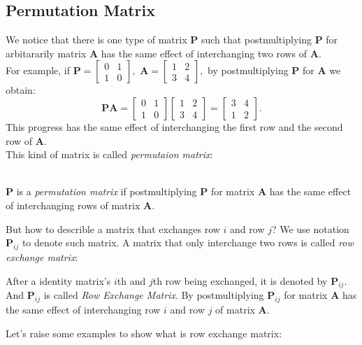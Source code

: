 \subsection{Permutation Matrix}
We notice that there is one type of matrix $\bm P$ such that postmultiplying $\bm P$ for arbitararily matrix $\bm A$ has the same effect of interchanging two rows of $\bm A$.\\
For example, if $\bm P=\begin{bmatrix}
0&1\\1&0
\end{bmatrix},$ $\bm A=\begin{bmatrix}
1&2\\3&4
\end{bmatrix},$ by postmultiplying $\bm P$ for $\bm A$ we obtain:
\[
\bm{PA}=\begin{bmatrix}
0&1\\1&0
\end{bmatrix}\begin{bmatrix}
1&2\\3&4
\end{bmatrix}=\begin{bmatrix}
3&4\\1&2
\end{bmatrix}.
\]
This progress has the same effect of interchanging the first row and the second row of $\bm A$.\\
This kind of matrix is called \textit{permutaion matrix}:
\begin{definition}\qquad\\
$\bm P$ is a \emph{permutation matrix} if postmultiplying $\bm P$ for matrix $\bm A$ has the same effect of interchanging rows of matrix $\bm A$.
\end{definition}
But how to describle a matrix that exchanges row $i$ and row $j$? We use notation $\bm P_{ij}$ to denote such
matrix. A matrix that only interchange two rows is called \textit{row exchange matrix}:
\begin{definition}
After a identity matrix’s $i$th and $j$th row being exchanged, it is denoted by $\bm P_{ij}$. And $\bm P_{ij}$ is called \emph{Row Exchange Matrix}. By postmultiplying $\bm P_{ij}$ for matrix $\bm A$ has the same effect of interchanging row $i$ and row $j$ of matrix $\bm A$.
\end{definition}
Let’s raise some examples to show what is row exchange matrix:
